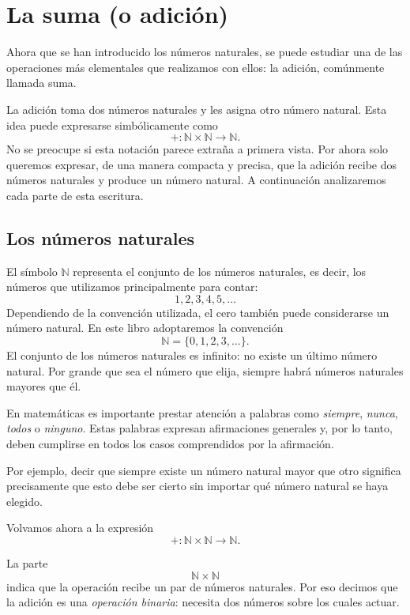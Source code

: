 \section{La suma (o adición)}

Ahora que se han introducido los números naturales, se puede estudiar una de las operaciones más elementales que realizamos con ellos: la adición, comúnmente llamada suma.

La adición toma dos números naturales y les asigna otro número natural. Esta idea puede expresarse simbólicamente como
\[
+\colon\mathbb{N}\times\mathbb{N}\to\mathbb{N}.
\]
No se preocupe si esta notación parece extraña a primera vista. Por ahora solo queremos expresar, de una manera compacta y precisa, que la adición recibe dos números naturales y produce un número natural. A continuación analizaremos cada parte de esta escritura.

\subsection{Los números naturales}

El símbolo \(\mathbb{N}\) representa el conjunto de los números naturales, es decir, los números que utilizamos principalmente para contar:
\[
1,2,3,4,5,\dots
\]
Dependiendo de la convención utilizada, el cero también puede considerarse un número natural. En este libro adoptaremos la convención
\[
\mathbb{N}=\{0,1,2,3,\dots\}.
\]
El conjunto de los números naturales es infinito: no existe un último número natural. Por grande que sea el número que elija, siempre habrá números naturales mayores que él.

\begin{note}
En matemáticas es importante prestar atención a palabras como \emph{siempre}, \emph{nunca}, \emph{todos} o \emph{ninguno}. Estas palabras expresan afirmaciones generales y, por lo tanto, deben cumplirse en todos los casos comprendidos por la afirmación.

Por ejemplo, decir que siempre existe un número natural mayor que otro significa precisamente que esto debe ser cierto sin importar qué número natural se haya elegido.
\end{note}

Volvamos ahora a la expresión
\[
+\colon\mathbb{N}\times\mathbb{N}\to\mathbb{N}.
\]

La parte
\[
\mathbb{N}\times\mathbb{N}
\]
indica que la operación recibe un par de números naturales. Por eso decimos que la adición es una \emph{operación binaria}: necesita dos números sobre los cuales actuar.

